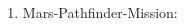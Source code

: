 \documentclass[ngerman]{fbi-aufgabenblatt}
\begin{document}

\begin{enumerate}
	\item Mars-Pathfinder-Mission:\\
	\begin{blockgraph}{52}{1}{0.3}

	\end{blockgraph}
		\begin{blockgraph}{52}{1}{0.3}

	\end{blockgraph}
	\begin{blockgraph}{52}{1}{0.3}

	\end{blockgraph}
	\begin{blockgraph}{32}{1}{0.3}


\end{blockgraph}
\end{enumerate}
\end{document}
